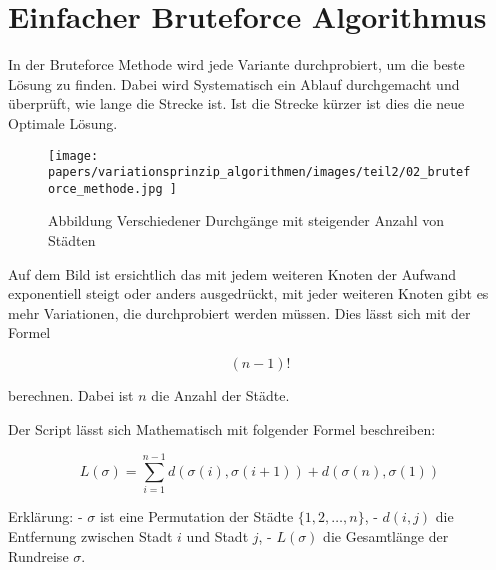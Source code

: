 %
%
%
%
\section{Einfacher Bruteforce Algorithmus}
In der Bruteforce Methode wird jede Variante durchprobiert, 
um die beste Lösung zu finden. Dabei wird Systematisch ein 
Ablauf durchgemacht und überprüft, wie lange die Strecke ist.
Ist die Strecke kürzer ist dies die neue Optimale Lösung.

\begin{figure} [h]
	\centering
	\texttt{[image: 
        papers/variationsprinzip\_algorithmen/images/teil2/02\_bruteforce\_methode.jpg
        ]}
	\caption{Abbildung Verschiedener Durchgänge mit steigender Anzahl von Städten}
	\label{fig:Abbildung Verschiedener Durchgänge mit steigender Anzahl von Städten}
\end{figure}

Auf dem Bild ist ersichtlich das mit jedem weiteren Knoten der Aufwand 
exponentiell steigt oder anders ausgedrückt, mit jeder weiteren Knoten
gibt es mehr Variationen, die durchprobiert werden müssen. Dies lässt
sich mit der Formel

\begin{equation}
    (n-1)!
\end{equation}

berechnen. Dabei ist \(n\) die Anzahl der Städte.

Der Script lässt sich Mathematisch mit folgender Formel beschreiben:

\begin{equation}
    L(\sigma) = \sum_{i=1}^{n-1} d(\sigma(i), \sigma(i+1)) + d(\sigma(n), \sigma(1))
\end{equation}

Erklärung:
- \( \sigma \) ist eine Permutation der Städte \( \{1, 2, \ldots, n\} \), 
- \( d(i, j) \) die Entfernung zwischen Stadt \( i \) und Stadt \( j \),
- \( L(\sigma) \) die Gesamtlänge der Rundreise \( \sigma \).
